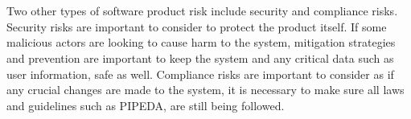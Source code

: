 \documentclass{article}
\begin{document}
\\\\
Two other types of software product risk include security and compliance risks. Security risks are important to consider to protect the product itself. If some malicious actors are looking to cause harm to the system, mitigation strategies and prevention are important to keep the system and any critical data such as user information, safe as well. Compliance risks are important to consider as if any crucial changes are made to the system, it is necessary to make sure all laws and guidelines such as PIPEDA, are still being followed. 
\end{document}
